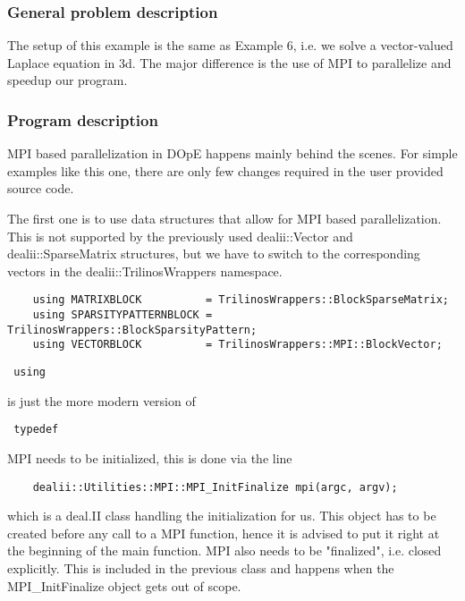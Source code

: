 \subsubsection{General problem description}
The setup of this example is the same as Example 6, i.e. we solve a vector-valued Laplace equation in 3d. The major difference is the use of MPI to parallelize and speedup our program.

\subsubsection{Program description}
MPI based parallelization in DOpE happens mainly behind the scenes. For simple examples like this one, there are only few changes required in the user provided source code.

The first one is to use data structures that allow for MPI based parallelization. This is not supported by the previously used dealii::Vector and dealii::SparseMatrix structures, but we have to switch to the corresponding vectors in the dealii::TrilinosWrappers namespace.

\begin{verbatim}
	using MATRIXBLOCK          = TrilinosWrappers::BlockSparseMatrix;
	using SPARSITYPATTERNBLOCK = TrilinosWrappers::BlockSparsityPattern;
	using VECTORBLOCK          = TrilinosWrappers::MPI::BlockVector;
\end{verbatim}

\begin{remark}
	\begin{verbatim} using \end{verbatim} is just the more modern version of \begin{verbatim} typedef \end{verbatim}
\end{remark}

MPI needs to be initialized, this is done via the line 
\begin{verbatim}
	dealii::Utilities::MPI::MPI_InitFinalize mpi(argc, argv);
\end{verbatim}
which is a deal.II class handling the initialization for us. This object has to be created before any call to a MPI function, hence it is advised to put it right at the beginning of the main function. MPI also needs to be "finalized", i.e. closed explicitly. This is included in the previous class and happens when the MPI_InitFinalize object gets out of scope.


